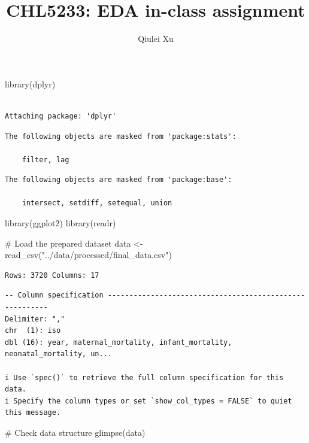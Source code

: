\documentclass[
  letterpaper,
  DIV=11,
  numbers=noendperiod]{scrartcl}
\title{CHL5233: EDA in-class assignment}
\author{Qiulei Xu}
\date{}
\newenvironment{Shaded}{\begin{snugshade}}{\end{snugshade}}
\newcommand{\CommentTok}[1]{\textcolor[rgb]{0.37,0.37,0.37}{#1}}
\newcommand{\FunctionTok}[1]{\textcolor[rgb]{0.28,0.35,0.67}{#1}}
\newcommand{\NormalTok}[1]{\textcolor[rgb]{0.00,0.23,0.31}{#1}}
\newcommand{\OtherTok}[1]{\textcolor[rgb]{0.00,0.23,0.31}{#1}}
\newcommand{\StringTok}[1]{\textcolor[rgb]{0.13,0.47,0.30}{#1}}
\begin{document}
\maketitle


\begin{Shaded}
\begin{Highlighting}[]
\FunctionTok{library}\NormalTok{(dplyr)}
\end{Highlighting}
\end{Shaded}

\begin{verbatim}

Attaching package: 'dplyr'
\end{verbatim}

\begin{verbatim}
The following objects are masked from 'package:stats':

    filter, lag
\end{verbatim}

\begin{verbatim}
The following objects are masked from 'package:base':

    intersect, setdiff, setequal, union
\end{verbatim}

\begin{Shaded}
\begin{Highlighting}[]
\FunctionTok{library}\NormalTok{(ggplot2)}
\FunctionTok{library}\NormalTok{(readr)}

\CommentTok{\# Load the prepared dataset}
\NormalTok{data }\OtherTok{\textless{}{-}} \FunctionTok{read\_csv}\NormalTok{(}\StringTok{"../data/processed/final\_data.csv"}\NormalTok{)}
\end{Highlighting}
\end{Shaded}

\begin{verbatim}
Rows: 3720 Columns: 17
\end{verbatim}

\begin{verbatim}
-- Column specification --------------------------------------------------------
Delimiter: ","
chr  (1): iso
dbl (16): year, maternal_mortality, infant_mortality, neonatal_mortality, un...

i Use `spec()` to retrieve the full column specification for this data.
i Specify the column types or set `show_col_types = FALSE` to quiet this message.
\end{verbatim}

\begin{Shaded}
\begin{Highlighting}[]
\CommentTok{\# Check data structure}
\FunctionTok{glimpse}\NormalTok{(data)}
\end{Highlighting}
\end{Shaded}
\end{document}
